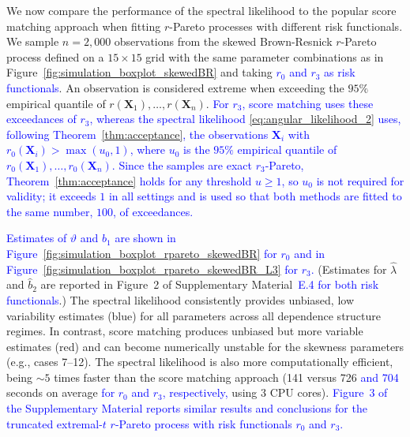 \documentclass[12pt]{article}
\newcommand{\PZ}{\textcolor{blue}}
\begin{document}
We now compare the performance of the spectral likelihood to the popular score matching approach \citep[see][]{deFondeville.Davison:2018} when fitting $r$-Pareto processes with different risk functionals.
%
We sample $n=2,000$ observations from the skewed Brown-Resnick $r$-Pareto process defined on a $15\times15$ grid with the same parameter combinations as in Figure~\ref{fig:simulation_boxplot_skewedBR} and taking \PZ{$r_0$ and $r_3$ as risk functionals}. An observation is considered extreme when exceeding the 
$95\%$ empirical quantile of $r(\bm X_1),\dots,r(\bm X_n)$.
\PZ{For $r_3$, score matching uses these exceedances of $r_3$, whereas the spectral likelihood \eqref{eq:angular_likelihood_2} uses, following Theorem~\ref{thm:acceptance}, the observations $\bm X_i$ with $r_0(\bm X_i)>\max(u_0,1)$, where $u_0$ is the $95\%$ empirical quantile of $r_0(\bm X_1),\dots,r_0(\bm X_n)$. Since the samples are exact $r_3$-Pareto, Theorem~\ref{thm:acceptance} holds for any threshold $u\geq1$, so $u_0$ is not required for validity; it exceeds $1$ in all settings and is used so that both methods are fitted to the same number, $100$, of exceedances.}
 
\PZ{Estimates of $\vartheta$ and $b_1$ are shown in Figure~\ref{fig:simulation_boxplot_rpareto_skewedBR}} \PZ{for $r_0$ and in Figure~\ref{fig:simulation_boxplot_rpareto_skewedBR_L3} for $r_3$}\PZ{.} 
(Estimates for $\hat{\lambda}$ and $\hat{b}_2$ are reported in Figure~2 of Supplementary Material~\PZ{E.4} \PZ{for both risk functionals}.)
%
The spectral likelihood consistently provides unbiased, low variability estimates (blue) for all 
parameters
across all dependence structure regimes. 
%
In contrast, score matching produces unbiased but more variable estimates (red) 
and can become
numerically unstable for the skewness parameters (e.g., cases 7--12).
% 
The spectral likelihood is also more computationally efficient, being ${\sim}5$ times faster than the score matching approach (141 versus 726 \PZ{and 704} seconds on average \PZ{for $r_0$ and $r_3$, respectively,} using 3 CPU cores). 
%
\PZ{Figure~3} \PZ{of the Supplementary Material reports} \PZ{similar results and conclusions for the truncated extremal-$t$ $r$-Pareto process with} \PZ{risk functionals $r_0$ and $r_3$}\PZ{.}
\end{document}
